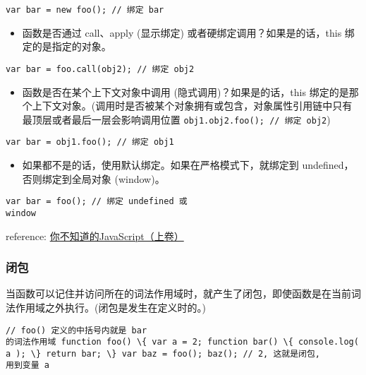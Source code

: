 \begin{verbatim}var bar = new foo(); // 绑定 bar 
\end{verbatim}

\begin{itemize}
\tightlist
\item
  函数是否通过 call、apply (显示绑定) 或者硬绑定调用？如果是的话，this
  绑定的是指定的对象。
\end{itemize}

\begin{verbatim}var bar = foo.call(obj2); // 绑定 obj2

\end{verbatim}

\begin{itemize}
\tightlist
\item
  函数是否在某个上下文对象中调用 (隐式调用)？如果是的话，this
  绑定的是那个上下文对象。(调用时是否被某个对象拥有或包含，对象属性引用链中只有最顶层或者最后一层会影响调用位置
  \texttt{obj1.obj2.foo();\ //\ 绑定\ obj2})
\end{itemize}

\begin{verbatim}var bar = obj1.foo(); // 绑定 obj1 
\end{verbatim}

\begin{itemize}
\tightlist
\item
  如果都不是的话，使用默认绑定。如果在严格模式下，就绑定到
  undefined，否则绑定到全局对象 (window)。
\end{itemize}

\begin{verbatim}var bar = foo(); // 绑定 undefined 或
window 
\end{verbatim}

reference:
\href{http://book.douban.com/subject/26351021/}{你不知道的JavaScript（上卷）}

\subsubsection{闭包}\label{ux95edux5305}

当函数可以记住并访问所在的词法作用域时，就产生了闭包，即使函数是在当前词法作用域之外执行。(闭包是发生在定义时的。)

\begin{verbatim}// foo() 定义的中括号内就是 bar
的词法作用域 function foo() \{ var a = 2; function bar() \{ console.log(
a ); \} return bar; \} var baz = foo(); baz(); // 2, 这就是闭包,
用到变量 a 
\end{verbatim}

